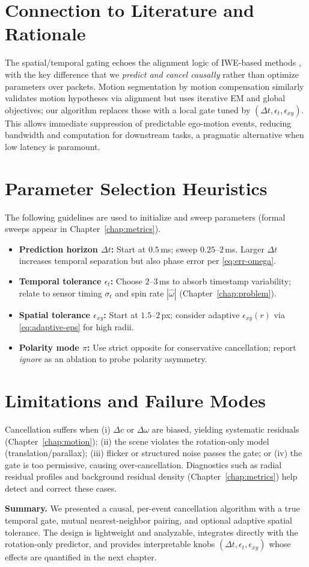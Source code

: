 \section{Connection to Literature and Rationale}
The spatial/temporal gating echoes the alignment logic of IWE-based methods \cite{Gallego2018CMax}, with the key difference that we \emph{predict and cancel causally} rather than optimize parameters over packets. Motion segmentation by motion compensation \cite{Stoffregen2019Segmentation} similarly validates motion hypotheses via alignment but uses iterative EM and global objectives; our algorithm replaces those with a local gate tuned by $(\Delta t,\epsilon_t,\epsilon_{xy})$. This allows immediate suppression of predictable ego-motion events, reducing bandwidth and computation for downstream tasks, a pragmatic alternative when low latency is paramount.

\section{Parameter Selection Heuristics}
The following guidelines are used to initialize and sweep parameters (formal sweeps appear in Chapter~\ref{chap:metrics}).
\begin{itemize}
    \item \textbf{Prediction horizon $\Delta t$:} Start at $0.5$\,ms; sweep $0.25$–$2$\,ms. Larger $\Delta t$ increases temporal separation but also phase error per \eqref{eq:err-omega}.
    \item \textbf{Temporal tolerance $\epsilon_t$:} Choose $2$–$3$\,ms to absorb timestamp variability; relate to sensor timing $\sigma_t$ and spin rate $|\hat\omega|$ (Chapter~\ref{chap:problem}).
    \item \textbf{Spatial tolerance $\epsilon_{xy}$:} Start at $1.5$–$2$\,px; consider adaptive $\epsilon_{xy}(r)$ via \eqref{eq:adaptive-eps} for high radii.
    \item \textbf{Polarity mode $\pi$:} Use strict opposite for conservative cancellation; report \emph{ignore} as an ablation to probe polarity asymmetry.
\end{itemize}

\section{Limitations and Failure Modes}
Cancellation suffers when (i) $\Delta c$ or $\Delta\omega$ are biased, yielding systematic residuals (Chapter~\ref{chap:motion}); (ii) the scene violates the rotation-only model (translation/parallax); (iii) flicker or structured noise passes the gate; or (iv) the gate is too permissive, causing over-cancellation. Diagnostics such as radial residual profiles and background residual density (Chapter~\ref{chap:metrics}) help detect and correct these cases.

\medskip
\noindent\textbf{Summary.} We presented a causal, per-event cancellation algorithm with a true temporal gate, mutual nearest-neighbor pairing, and optional adaptive spatial tolerance. The design is lightweight and analyzable, integrates directly with the rotation-only predictor, and provides interpretable knobs $(\Delta t,\epsilon_t,\epsilon_{xy})$ whose effects are quantified in the next chapter.
